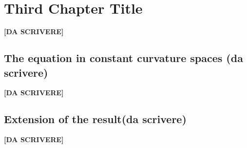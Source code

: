 \chapter{Third Chapter Title}
{\vspace{10pt}\LARGE \bf [DA SCRIVERE]}
\section{The equation in constant curvature spaces (da scrivere)}	
{\vspace{10pt}\LARGE \bf [DA SCRIVERE]}

\clearpage
\section{Extension of the result(da scrivere)}	
{\vspace{10pt}\LARGE \bf [DA SCRIVERE]}
